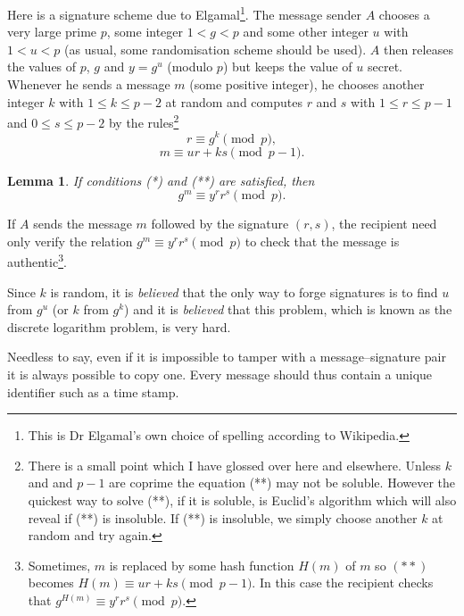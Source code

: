 \documentclass[12pt,a4paper]{article}
\theoremstyle{plain}
\newtheorem{lemma}[theorem]{Lemma}
\theoremstyle{definition}
\begin{document}
    Here is a signature scheme due to
    Elgamal\footnote{This
    is Dr Elgamal's own choice of spelling
    according to Wikipedia.}\label{P;Elgamal}.
    The message sender $A$ chooses a very large
    prime $p$, some integer $1<g<p$
    and some other integer $u$ with $1<u<p$
    (as usual, some randomisation scheme should be used).
    $A$ then releases the values of $p$, $g$
    and $y=g^{u}$ (modulo $p$) but keeps the
    value of $u$ secret. Whenever he sends
    a message $m$ (some positive integer),
    he chooses another integer $k$
    with $1\leq k\leq p-2$ at random
    and computes
    $r$ and $s$ with $1\leq r\leq p-1$
    and $0\leq s\leq p-2$
    by the rules\footnote{There is
    a small point which
    I have glossed over here and elsewhere.
    Unless $k$ and and $p-1$ are coprime
    the equation (**) may not be soluble.
    However the quickest way to solve (**),
    if it is soluble, is Euclid's algorithm
    which will also reveal if (**) is
    insoluble. If (**) is insoluble, we simply
    choose another $k$ at random and try
    again.}
    \begin{equation*}
        r\equiv g^{k} \pmod{p},\tag*{(*)}
    \end{equation*}
    \begin{equation*}
        m\equiv ur+ks \pmod{p-1}.\tag*{(**)}
    \end{equation*}
    \begin{lemma}
        If conditions (*) and (**) are satisfied,
        then
        \[g^{m}\equiv y^{r}r^{s}\pmod{p}.\]
    \end{lemma}
    \noindent
    If $A$ sends the message $m$ followed by the signature $(r,s)$,
    the recipient need only verify the relation
    $g^{m}\equiv y^{r}r^{s}\pmod{p}$ to check
    that the message is authentic\footnote{Sometimes,
    $m$ is replaced by some hash function $H(m)$ of $m$
    so $(**)$ becomes $H(m)\equiv ur+ks \pmod{p-1}$.
    In this case the recipient
    checks that $g^{H(m)}\equiv y^{r}r^{s}\pmod{p}$.}.

    Since $k$ is random, it is \emph{believed} that the
    only way to forge signatures is to find $u$
    from $g^{u}$ (or $k$ from $g^{k}$) and it is \emph{believed}
    that this problem, which is known as
    the discrete logarithm problem, is very
    hard.

    Needless to say, even if it is impossible to
    tamper with a message--signature pair it is always
    possible to copy one. Every message should thus
    contain a unique identifier such as a time stamp.
\end{document}
